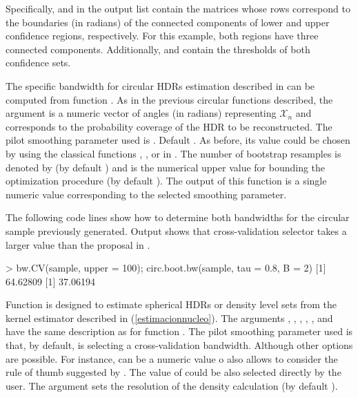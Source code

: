 Specifically,  and  in the output list contain the matrices whose rows correspond to the boundaries (in radians) of the connected components of lower and upper confidence regions, respectively. For this example, both regions have three connected components. Additionally,  and  contain the thresholds of both confidence sets.

The specific bandwidth for circular HDRs estimation described in \cite{saavedra2020nonparametric} can be computed from function . As in the previous circular functions described, the argument  is a numeric vector of angles (in radians) representing $_n$ and  corresponds to the probability coverage  of the HDR to be reconstructed. The pilot smoothing parameter used is . Default . As before, its value could be chosen by using the classical functions , ,  or  in . The number of bootstrap resamples is denoted by  (by default ) and  is the numerical upper value for bounding the optimization procedure (by default ). The output of this function is a single numeric value corresponding to the selected smoothing parameter.

 The following code lines show how to determine both bandwidths for the circular sample previously generated. Output shows that cross-validation selector takes a larger value than the proposal in \cite{saavedra2020nonparametric}.	
\begin{example}
> bw.CV(sample, upper = 100); circ.boot.bw(sample, tau = 0.8, B = 2)
[1] 64.62809
[1] 37.06194
\end{example}

Function  is designed to estimate spherical HDRs or density level sets from the kernel estimator described in (\ref{estimacionnucleo}). The arguments , , , , ,  and  have the same description as for function . The pilot smoothing parameter used is  that, by default, is  selecting a cross-validation bandwidth. Although other options are possible. For instance,  can be a numeric value o also  allows to consider the rule of thumb suggested by \cite{garcia2013exact}. The value of  could be also selected directly by the user. The argument  sets the resolution of the density calculation (by default ).

